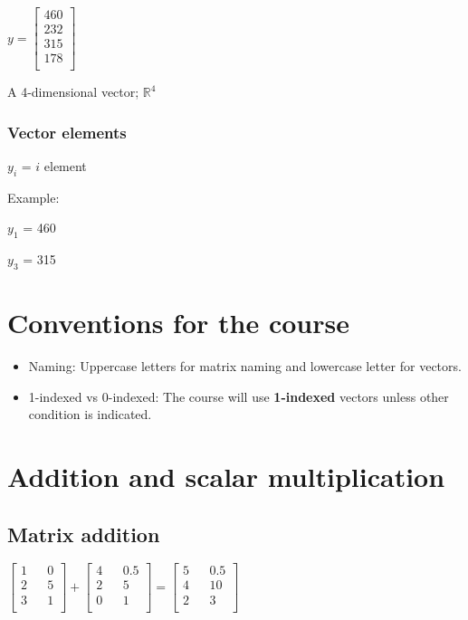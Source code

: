 \documentclass[a4paper]{report}
\begin{document}
        $y =
        \begin{bmatrix}
          460 \\
          232 \\
          315 \\
          178 \\
        \end{bmatrix}$

        A 4-dimensional vector; $\mathbb{R}^4$

        \subsubsection{Vector elements}

          $y_{i}$ = $i$ element

          Example:

          $y_{1}$ = 460

          $y_{3}$ = 315


    \section{Conventions for the course}
          
        \begin{itemize}
          \item Naming: Uppercase letters for matrix naming and lowercase letter for vectors.
          \item 1-indexed vs 0-indexed: The course will use \textbf{1-indexed} vectors unless other condition is indicated.
        \end{itemize}


    \section{Addition and scalar multiplication}

      \subsection{Matrix addition}

        $\begin{bmatrix}
          1 && 0 \\
          2 && 5 \\
          3 && 1 \\
        \end{bmatrix}
        + 
        \begin{bmatrix}
          4 && 0.5 \\
          2 && 5 \\
          0 && 1 \\
        \end{bmatrix}
        =
        \begin{bmatrix}
          5 && 0.5 \\
          4 && 10 \\
          2 && 3 \\
        \end{bmatrix}$
\end{document}
